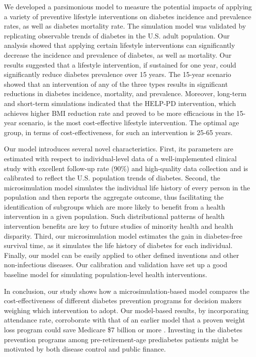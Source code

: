 \documentclass[fleqn,10pt]{wlscirep}
\begin{document}
We developed a parsimonious model to measure the potential impacts of applying a variety of preventive lifestyle interventions on diabetes incidence and prevalence rates, as well as diabetes mortality rate. The simulation model was validated by replicating observable trends of diabetes in the U.S. adult population.
Our analysis showed that applying certain lifestyle interventions can significantly decrease the incidence and prevalence of diabetes, as well as mortality. Our results suggested that a lifestyle intervention, if sustained for one year, could significantly reduce diabetes prevalence over 15 years. The 15-year scenario showed that an intervention of any of the three types results in significant reductions in diabetes incidence, mortality, and prevalence. Moreover, long-term and short-term simulations indicated that the HELP-PD intervention, which achieves higher BMI reduction rate and proved to be more efficacious in the 15-year scenario, is the most cost-effective lifestyle intervention. The optimal age group, in terms of cost-effectiveness, for such an intervention is 25-65 years.

Our model introduces several novel characteristics. First, its parameters are estimated with respect to individual-level data of a well-implemented clinical study with excellent follow-up rate (90\%) and high-quality data collection and is calibrated to reflect the U.S. population trends of diabetes. Second, the microsimulation model simulates the individual life history of every person in the population and then reports the aggregate outcome, thus facilitating the identification of subgroups which are more likely to benefit from a health intervention in a given population. Such distributional patterns of health intervention benefits are key to future studies of minority health and health disparity. Third, our microsimulation model estimates the gain in diabetes-free survival time, as it simulates the life history of diabetes for each individual.  Finally, our model can be easily applied to other defined inventions and other non-infectious diseases. Our calibration and validation have set up a good baseline model for simulating population-level health interventions.

In conclusion, our study shows how a microsimulation-based model compares the cost-effectiveness of different diabetes prevention programs for decision makers weighing which intervention to adopt. Our model-based results, by incorporating attendance rate, corroborate with that of an earlier model that a proven weight loss program could save Medicare \$7 billion or more \cite{thorpe2011enrolling}. Investing in the diabetes prevention programs among pre-retirement-age prediabetes patients might be motivated by both disease control and public finance.
\end{document}
